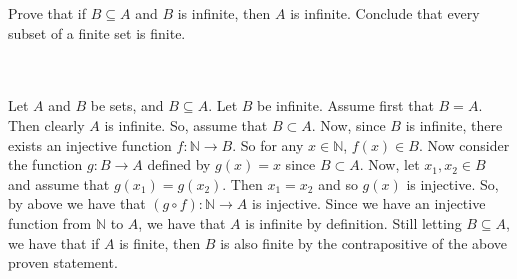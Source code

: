 Prove that if $B\subseteq A$ and $B$ is infinite, then $A$ is infinite. Conclude that every subset
of a finite set is finite.\\\\

\begin{solution}\renewcommand{\qedsymbol}{}\ \\
    Let $A$ and $B$ be sets, and $B\subseteq A$. Let $B$ be infinite. Assume first that $B=A$. Then
    clearly $A$ is infinite. So, assume that $B\subset A$. Now, since $B$ is infinite, there exists an
    injective function $f:\mathbb{N}\rightarrow B$. So for any $x\in\mathbb{N}$, $f(x)\in B$. Now
    consider the function $g:B\rightarrow A$ defined by $g(x)=x$ since $B\subset A$. Now, let
    $x_1,x_2\in B$ and assume that $g(x_1)=g(x_2)$. Then $x_1=x_2$ and so $g(x)$ is injective. So, by
    above we have that $(g\circ f):\mathbb{N}\rightarrow A$ is injective. Since we have an injective
    function from $\mathbb{N}$ to $A$, we have that $A$ is infinite by definition. Still letting
    $B\subseteq A$, we have that if $A$ is finite, then $B$ is also finite by the contrapositive of the
    above proven statement.

\end{solution}